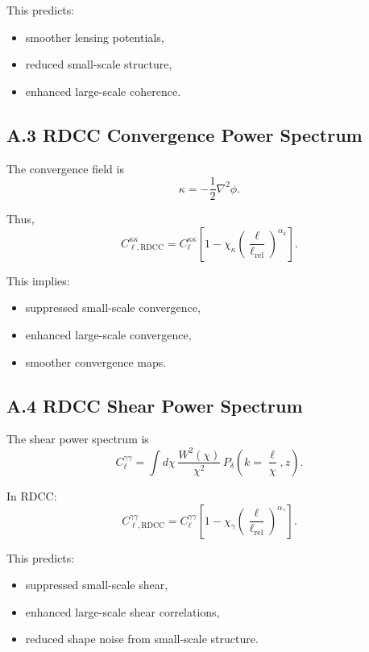 \documentclass[11pt,a4paper]{article}
\begin{document}
This predicts:
\begin{itemize}
\item smoother lensing potentials,
\item reduced small-scale structure,
\item enhanced large-scale coherence.
\end{itemize}

\subsection*{A.3 RDCC Convergence Power Spectrum}

The convergence field is
\begin{equation}
\kappa
=
-\frac{1}{2}\nabla^{2}\phi.
\end{equation}

Thus,
\begin{equation}
C_{\ell,\mathrm{RDCC}}^{\kappa\kappa}
=
C_{\ell}^{\kappa\kappa}
\left[
1
-
\chi_{\kappa}
\left(
\frac{\ell}{\ell_{\mathrm{rel}}}
\right)^{\alpha_{\kappa}}
\right].
\end{equation}

This implies:
\begin{itemize}
\item suppressed small-scale convergence,
\item enhanced large-scale convergence,
\item smoother convergence maps.
\end{itemize}

\subsection*{A.4 RDCC Shear Power Spectrum}

The shear power spectrum is
\begin{equation}
C_{\ell}^{\gamma\gamma}
=
\int d\chi\,
\frac{W^{2}(\chi)}{\chi^{2}}\,
P_{\delta}\!\left(k=\frac{\ell}{\chi},z\right).
\end{equation}

In RDCC:
\begin{equation}
C_{\ell,\mathrm{RDCC}}^{\gamma\gamma}
=
C_{\ell}^{\gamma\gamma}
\left[
1
-
\chi_{\gamma}
\left(
\frac{\ell}{\ell_{\mathrm{rel}}}
\right)^{\alpha_{\gamma}}
\right].
\end{equation}

This predicts:
\begin{itemize}
\item suppressed small-scale shear,
\item enhanced large-scale shear correlations,
\item reduced shape noise from small-scale structure.
\end{itemize}
\end{document}
